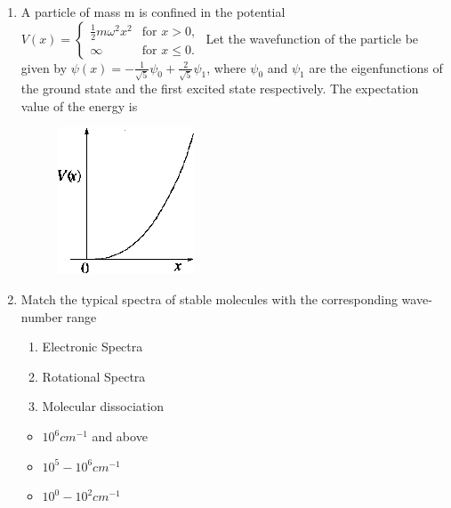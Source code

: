 \documentclass[journal,12pt,onecolumn]{IEEEtran}
\theoremstyle{remark}
\begin{document}
\begin{enumerate}
\item A particle of mass m is confined in the potential $V(x)=\begin{cases} \frac{1}{2}m\omega^{2}x^{2} & \text{for } x>0, \\ \infty & \text{for } x \le 0. \end{cases}$
	Let the wavefunction of the particle be given by $\psi(x)=-\frac{1}{\sqrt{5}}\psi_{0}+\frac{2}{\sqrt{5}}\psi_{1}$, where $\psi_0$ and $\psi_1$ are the eigenfunctions of the ground state and the first excited state respectively. The expectation value of the energy is\hfill{}
	\begin{figure}[H] \centering
		\caption*{} \label{35} \includegraphics[width=0.2\columnwidth]{figs/35.png}
	\end{figure}


\begin{enumerate}  \end{enumerate}

\item Match the typical spectra of stable molecules with the corresponding wave-number range\hfill{}

\begin{multicols}{2}
 \begin{enumerate}
  \item Electronic Spectra
  \item Rotational Spectra
  \item Molecular dissociation
 \end{enumerate}
\columnbreak
\begin{itemize}
 \item $10^6 cm^{-1}$ and above
 \item $10^5 - 10^6 cm^{-1}$
 \item $10^0 - 10^2 cm^{-1}$
\end{itemize}



\end{multicols}
\end{enumerate}
\end{document}
